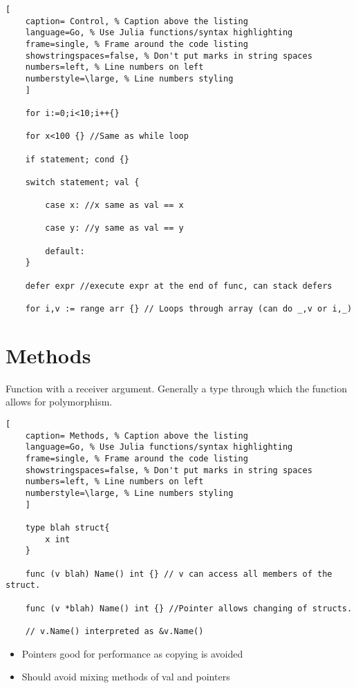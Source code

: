 \documentclass[11pt]{scrartcl} %
\begin{document}
\begin{lstlisting}[
	caption= Control, % Caption above the listing
	language=Go, % Use Julia functions/syntax highlighting
	frame=single, % Frame around the code listing
	showstringspaces=false, % Don't put marks in string spaces
	numbers=left, % Line numbers on left
	numberstyle=\large, % Line numbers styling
	]

	for i:=0;i<10;i++{}

	for x<100 {} //Same as while loop

	if statement; cond {}

	switch statement; val {

		case x: //x same as val == x

		case y: //y same as val == y

		default:
	}

	defer expr //execute expr at the end of func, can stack defers

	for i,v := range arr {} // Loops through array (can do _,v or i,_)

\end{lstlisting}

\section{Methods}

Function with a receiver argument. Generally a type through which the function allows for polymorphism.

\begin{lstlisting}[
	caption= Methods, % Caption above the listing
	language=Go, % Use Julia functions/syntax highlighting
	frame=single, % Frame around the code listing
	showstringspaces=false, % Don't put marks in string spaces
	numbers=left, % Line numbers on left
	numberstyle=\large, % Line numbers styling
	]

	type blah struct{
		x int
	}

	func (v blah) Name() int {} // v can access all members of the struct.

	func (v *blah) Name() int {} //Pointer allows changing of structs.

	// v.Name() interpreted as &v.Name()
\end{lstlisting}

\begin{itemize}
	\item Pointers good for performance as copying is avoided
	\item Should avoid mixing methods of val and pointers
\end{itemize}
\end{document}
